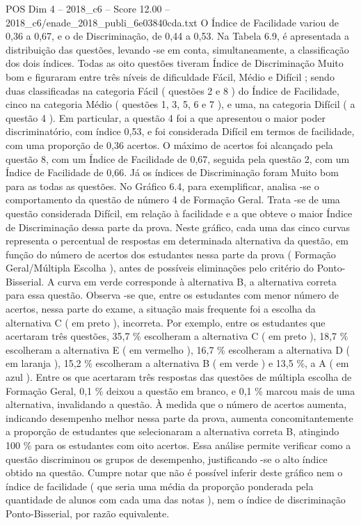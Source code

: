 \begin{textsample}{POS Dim 4 – 2018\_c6 – Score 12.00 – 2018\_c6/enade\_2018\_publi\_6e03840cda.txt}
O Índice de Facilidade variou de 0,36 a 0,67, e o de Discriminação, de 0,44 a 0,53.
Na Tabela 6.9, é apresentada a distribuição das questões, levando -se em conta, simultaneamente, a classificação dos dois índices.
Todas as oito questões tiveram Índice de Discriminação Muito bom e figuraram entre três níveis de dificuldade Fácil, Médio e Difícil ; sendo duas classificadas na categoria Fácil ( questões 2 e 8 ) do Índice de Facilidade, cinco na categoria Médio ( questões 1, 3, 5, 6 e 7 ), e uma, na categoria Difícil ( a questão 4 ).
Em particular, a questão 4 foi a que apresentou o maior poder discriminatório, com índice 0,53, e foi considerada Difícil em termos de facilidade, com uma proporção de 0,36 acertos.
O máximo de acertos foi alcançado pela questão 8, com um Índice de Facilidade de 0,67, seguida pela questão 2, com um Índice de Facilidade de 0,66.
Já os índices de Discriminação foram Muito bom para as todas as questões.
No Gráfico 6.4, para exemplificar, analisa -se o comportamento da questão de número 4 de Formação Geral.
Trata -se de uma questão considerada Difícil, em relação à facilidade e a que obteve o maior Índice de Discriminação dessa parte da prova.
Neste gráfico, cada uma das cinco curvas representa o percentual de respostas em determinada alternativa da questão, em função do número de acertos dos estudantes nessa parte da prova ( Formação Geral/Múltipla Escolha ), antes de possíveis eliminações pelo critério do Ponto-Bisserial.
A curva em verde corresponde à alternativa B, a alternativa correta para essa questão.
Observa -se que, entre os estudantes com menor número de acertos, nessa parte do exame, a situação mais frequente foi a escolha da alternativa C ( em preto ), incorreta.
Por exemplo, entre os estudantes que acertaram três questões, 35,7 \% escolheram a alternativa C ( em preto ), 18,7 \% escolheram a alternativa E ( em vermelho ), 16,7 \% escolheram a alternativa D ( em laranja ), 15,2 \% escolheram a alternativa B ( em verde ) e 13,5 \%, a A ( em azul ).
Entre os que acertaram três respostas das questões de múltipla escolha de Formação Geral, 0,1 \% deixou a questão em branco, e 0,1 \% marcou mais de uma alternativa, invalidando a questão.
À medida que o número de acertos aumenta, indicando desempenho melhor nessa parte da prova, aumenta concomitantemente a proporção de estudantes que selecionaram a alternativa correta B, atingindo 100 \% para os estudantes com oito acertos.
Essa análise permite verificar como a questão discriminou os grupos de desempenho, justificando -se o alto índice obtido na questão.
Cumpre notar que não é possível inferir deste gráfico nem o índice de facilidade ( que seria uma média da proporção ponderada pela quantidade de alunos com cada uma das notas ), nem o índice de discriminação Ponto-Bisserial, por razão equivalente.

\end{textsample}
